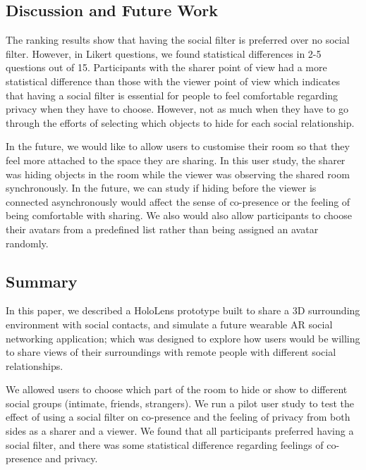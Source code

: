 \subsection{Discussion and Future Work}

The ranking results show that having the social filter is preferred over no social filter. However, in Likert questions, we found statistical differences in 2-5 questions out of 15. Participants with the sharer point of view had a more statistical difference than those with the viewer point of view which indicates that having a social filter is essential for people to feel comfortable regarding privacy when they have to choose. However, not as much when they have to go through the efforts of selecting which objects to hide for each social relationship.  

In the future, we would like to allow users to customise their room so that they feel more attached to the space they are sharing. In this user study, the sharer was hiding objects in the room while the viewer was observing the shared room synchronously. In the future, we can study if hiding before the viewer is connected asynchronously would affect the sense of co-presence or the feeling of being comfortable with sharing. We also would also allow participants to choose their avatars from a predefined list rather than being assigned an avatar randomly.   

\subsection{Summary}

In this paper, we described a HoloLens prototype built to share a 3D surrounding environment with social contacts, and simulate a future wearable AR social networking application; which was designed to explore how users would be willing to share views of their surroundings with remote people with different social relationships. 

We allowed users to choose which part of the room to hide or show to different social groups (intimate, friends, strangers). We run a pilot user study to test the effect of using a social filter on co-presence and the feeling of privacy from both sides as a sharer and a viewer. We found that all participants preferred having a social filter, and there was some statistical difference regarding feelings of co-presence and privacy. 

